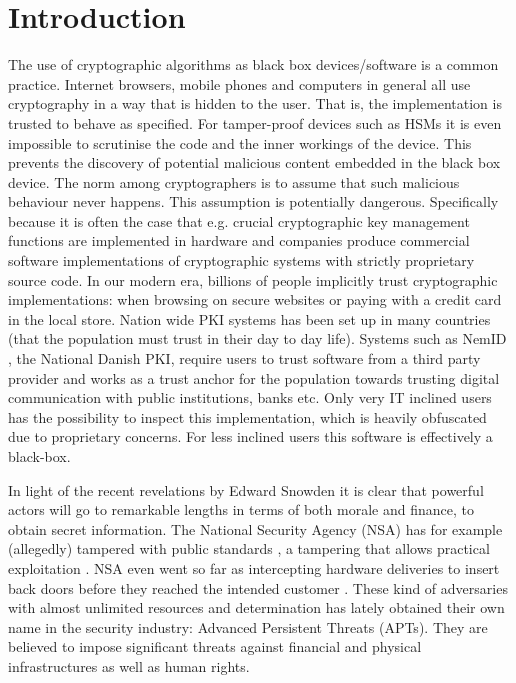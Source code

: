 \chapter{Introduction}

The use of cryptographic algorithms as black box devices/software is a common practice. Internet browsers, mobile phones and computers in general all use cryptography in a way that is hidden to the user. That is, the implementation is trusted to behave as specified. For tamper-proof devices such as HSMs it is even impossible to scrutinise the code and the inner workings of the device. This prevents the discovery of potential malicious content embedded in the black box device. The norm among cryptographers is to assume that such malicious behaviour never happens. This assumption is potentially dangerous. Specifically because it is often the case that e.g. crucial cryptographic key management functions are implemented in hardware and companies produce commercial software implementations of cryptographic systems with strictly proprietary source code. In our modern era, billions of people implicitly trust cryptographic implementations: when browsing on secure websites or paying with a credit card in the local store. Nation wide PKI systems has been set up in many countries (that the population must trust in their day to day life). Systems such as NemID \cite{NemID}, the National Danish PKI, require users to trust software from a third party provider and works as a trust anchor for the population towards trusting digital communication with public institutions, banks etc. Only very IT inclined users has the possibility to inspect this implementation, which is heavily obfuscated \cite{Obfuscated} due to proprietary  concerns. For less inclined users this software is effectively a black-box. 

In light of the recent revelations by Edward Snowden \cite{BBG,PLS} it is clear that powerful actors will go to remarkable lengths in terms of both morale and finance, to obtain secret information. The National Security Agency (NSA) has for example (allegedly) tampered with public standards \cite{Gre}, a tampering that allows practical exploitation \cite{Bernstein2014}. NSA even went so far as intercepting hardware deliveries to insert back doors before they reached the intended customer \cite{Gre}. These kind of adversaries with almost unlimited resources and determination has lately obtained their own name in the security industry: Advanced Persistent Threats (APTs). They are believed to impose significant threats against financial and physical infrastructures as well as human rights. 

